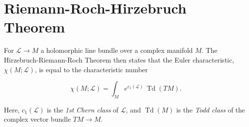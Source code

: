 \documentclass{article}
\newcommand{\ra}{\rightarrow}
\newcommand{\mcL}{\mathcal{L}}
\DeclareMathOperator{\Td}{Td}
\begin{document}
\section{Riemann-Roch-Hirzebruch Theorem}

For $\mcL \ra M$ a holomorphic line bundle over a complex manifold $M$. The Hirzebruch-Riemann-Roch Theorem then states that the Euler characteristic, $\chi(M; \mcL)$, is equal to the characteristic number

\begin{equation*}
	\chi(M; \mcL) =	\int_{M} e^{c_{1}(\mcL)}\, \Td(TM).
\end{equation*}

Here, $c_{1}(\mcL)$ is the \emph{1st Chern class} of $\mcL$, and $\Td(M)$ is the \emph{Todd class} of the complex vector bundle $TM \ra M$.







  


\end{document}
